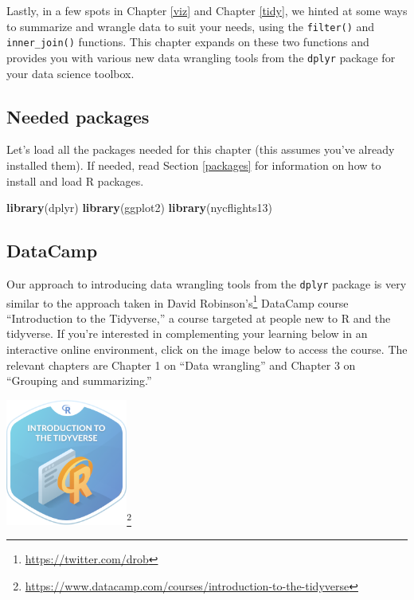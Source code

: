 \documentclass[12pt,]{krantz}
\makeatletter
\newenvironment{Shaded}{\begin{snugshade}}{\end{snugshade}}
\newcommand{\KeywordTok}[1]{\textcolor[rgb]{0.27,0.27,0.27}{\textbf{#1}}}
\newcommand{\NormalTok}[1]{#1}
\renewcommand{\href}[2]{#2\footnote{\url{#1}}}
\newenvironment{kframe}{%
\medskip{}
\setlength{\fboxsep}{.8em}
 \def\at@end@of@kframe{}%
 \ifinner\ifhmode%
  \def\at@end@of@kframe{\end{minipage}}%
  \begin{minipage}{\columnwidth}%
 \fi\fi%
 \def\FrameCommand##1{\hskip\@totalleftmargin \hskip-\fboxsep
 \colorbox{shadecolor}{##1}\hskip-\fboxsep
     \hskip-\linewidth \hskip-\@totalleftmargin \hskip\columnwidth}%
 \MakeFramed {\advance\hsize-\width
   \@totalleftmargin\z@ \linewidth\hsize
   \@setminipage}}%
 {\par\unskip\endMakeFramed%
 \at@end@of@kframe}
\renewenvironment{Shaded}{\begin{kframe}}{\end{kframe}}
\theoremstyle{definition}
\theoremstyle{definition}
\theoremstyle{definition}
\theoremstyle{remark}
\makeatother
\begin{document}
Lastly, in a few spots in Chapter \ref{viz} and Chapter \ref{tidy}, we
hinted at some ways to summarize and wrangle data to suit your needs,
using the \texttt{filter()} and \texttt{inner\_join()} functions. This
chapter expands on these two functions and provides you with various new
data wrangling tools from the \texttt{dplyr} package \citep{R-dplyr} for
your data science toolbox.

\subsection*{Needed packages}\label{needed-packages-2}


Let's load all the packages needed for this chapter (this assumes you've
already installed them). If needed, read Section \ref{packages} for
information on how to install and load R packages.

\begin{Shaded}
\begin{Highlighting}[]
\KeywordTok{library}\NormalTok{(dplyr)}
\KeywordTok{library}\NormalTok{(ggplot2)}
\KeywordTok{library}\NormalTok{(nycflights13)}
\end{Highlighting}
\end{Shaded}

\subsection*{DataCamp}\label{datacamp-2}


Our approach to introducing data wrangling tools from the \texttt{dplyr}
package is very similar to the approach taken in
\href{https://twitter.com/drob}{David Robinson's} DataCamp course
``Introduction to the Tidyverse,'' a course targeted at people new to R
and the tidyverse. If you're interested in complementing your learning
below in an interactive online environment, click on the image below to
access the course. The relevant chapters are Chapter 1 on ``Data
wrangling'' and Chapter 3 on ``Grouping and summarizing.''

\begin{center}
\href{https://www.datacamp.com/courses/introduction-to-the-tidyverse}{\includegraphics[width=0.3\textwidth]{images/datacamp_intro_to_tidyverse.png}}
\end{center}
\end{document}
